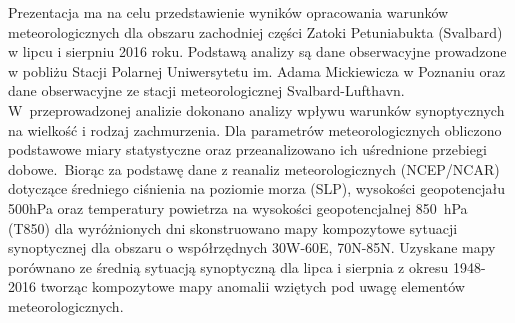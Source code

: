 \documentclass[\main/boa.tex]{subfiles}
\begin{document}
Prezentacja ma na celu przedstawienie wyników opracowania warunków meteorologicznych dla obszaru zachodniej części Zatoki Petuniabukta (Svalbard) w lipcu 
i sierpniu 2016 roku. Podstawą analizy są dane obserwacyjne prowadzone w pobliżu Stacji Polarnej Uniwersytetu im. Adama Mickiewicza w Poznaniu oraz dane obserwacyjne ze stacji meteorologicznej Svalbard-Lufthavn. W~przeprowadzonej analizie dokonano analizy wpływu warunków synoptycznych na wielkość i rodzaj zachmurzenia. Dla parametrów meteorologicznych obliczono podstawowe miary statystyczne oraz przeanalizowano ich uśrednione przebiegi dobowe. Biorąc za podstawę dane z reanaliz meteorologicznych (NCEP/NCAR) dotyczące średniego ciśnienia na poziomie morza (SLP), wysokości geopotencjału 500hPa oraz temperatury powietrza na wysokości geopotencjalnej 850~hPa (T850) dla wyróżnionych dni skonstruowano mapy kompozytowe sytuacji synoptycznej dla obszaru o współrzędnych 30W-60E, 70N-85N. Uzyskane mapy porównano ze średnią sytuacją synoptyczną dla lipca i sierpnia z okresu 1948-2016 tworząc kompozytowe mapy anomalii wziętych pod uwagę elementów meteorologicznych.
\end{document}
